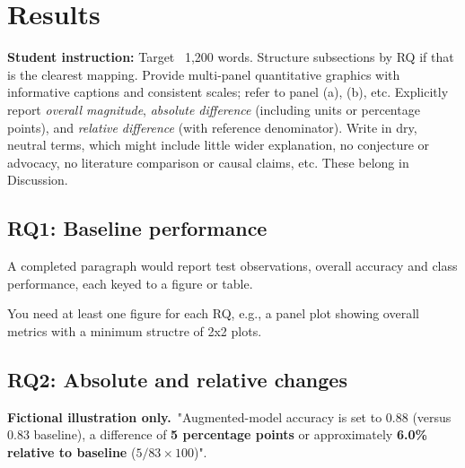 \documentclass[11pt,letterpaper]{article}
\newcommand{\guide}[1]{\par\begingroup\color{blue!60!black}\small\textbf{Student
instruction:} #1\par\endgroup}
\newcommand{\fiction}{\textbf{Fictional illustration only.}}
\begin{document}
\section{Results}
\guide{Target ~1,200 words. Structure subsections by RQ if that is the clearest mapping.
Provide multi-panel quantitative graphics with informative captions and consistent scales;
refer to panel (a), (b), etc. Explicitly report \emph{overall magnitude}, \emph{absolute
difference} (including units or percentage points), and \emph{relative difference} (with
reference denominator). Write in dry, neutral terms, which might include little wider explanation, 
no conjecture or advocacy, no literature comparison or causal claims, etc. These belong in Discussion.}
\subsection{RQ1: Baseline performance}
A completed paragraph would report test observations, overall accuracy and class
performance, each keyed to a figure or table. 

You need at least one figure for each RQ, e.g., a panel plot showing overall metrics
with a minimum structre of 2x2 plots.

\subsection{RQ2: Absolute and relative changes}
\fiction\ "Augmented-model accuracy is set to 0.88 (versus 0.83 baseline), a difference of
\textbf{5 percentage points} or approximately \textbf{6.0\% relative to baseline}
($5/83\times100$)". 
\end{document}
